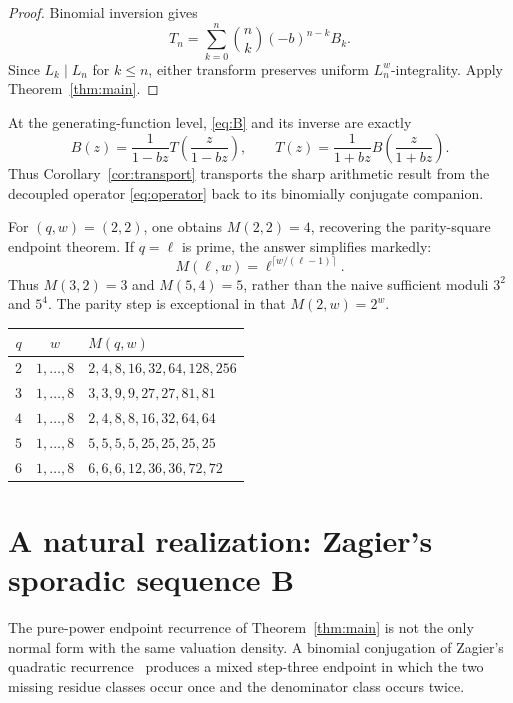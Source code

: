 \documentclass[11pt]{article}
\theoremstyle{remark}
\begin{document}
\begin{proof}
Binomial inversion gives
\[
 T_n=\sum_{k=0}^n\binom nk(-b)^{n-k}B_k.
\]
Since $L_k\mid L_n$ for $k\le n$, either transform preserves uniform
$L_n^w$-integrality.  Apply Theorem~\ref{thm:main}.
\end{proof}

At the generating-function level, \eqref{eq:B} and its inverse are exactly
\[
 B(z)=\frac1{1-bz}T\!\left(\frac{z}{1-bz}\right),
 \qquad
 T(z)=\frac1{1+bz}B\!\left(\frac{z}{1+bz}\right).
\]
Thus Corollary~\ref{cor:transport} transports the sharp arithmetic result from
the decoupled operator \eqref{eq:operator} back to its binomially conjugate
companion.

For $(q,w)=(2,2)$, one obtains $M(2,2)=4$, recovering the parity-square
endpoint theorem.  If $q=\ell$ is prime, the answer simplifies markedly:
\begin{equation}\label{eq:prime}
 M(\ell,w)=\ell^{\lceil w/(\ell-1)\rceil}.
\end{equation}
Thus $M(3,2)=3$ and $M(5,4)=5$, rather than the naive sufficient moduli
$3^2$ and $5^4$.  The parity step is exceptional in that
$M(2,w)=2^w$.

\begin{center}
\begin{tabular}{ccl}
\toprule
$q$ & $w$ & $M(q,w)$\\
\midrule
$2$ & $1,\ldots,8$ & $2,4,8,16,32,64,128,256$\\
$3$ & $1,\ldots,8$ & $3,3,9,9,27,27,81,81$\\
$4$ & $1,\ldots,8$ & $2,4,8,8,16,32,64,64$\\
$5$ & $1,\ldots,8$ & $5,5,5,5,25,25,25,25$\\
$6$ & $1,\ldots,8$ & $6,6,6,12,36,36,72,72$\\
\bottomrule
\end{tabular}
\end{center}

\section{A natural realization: Zagier's sporadic sequence
\texorpdfstring{$\mathbf B$}{B}}

The pure-power endpoint recurrence of Theorem~\ref{thm:main} is not the only
normal form with the same valuation density.  A binomial conjugation of
Zagier's quadratic recurrence~\cite{Zagier} produces a mixed step-three endpoint in which
the two missing residue classes occur once and the denominator class occurs
twice.
\end{document}
